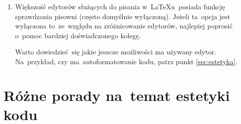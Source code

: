 \documentclass[a4paper,11pt]{article}
\newcommand{\tbs}{\textbackslash}  %
\begin{document}
\begin{enumerate}
  Jakikolwiek byłby dokładny sposób działania \texttt{\tbs
    newcommand}, sprawia~on, że~czasem \LaTeX{} protestuje jeśli
  w~definicji komendy nie umieści~się w~definicji dodatkowej pary
  nawiasów wąsatych wokół argumentów: \texttt{\#numer}. Dlatego
  w~przykładach w~tym tekście zawsze taką parę umieszczamy.
\item Większość edytorów służących do pisania w~\LaTeX u~posiada
  funkcję sprawdzania pisowni (często domyślnie wyłączoną). Jeżeli
  ta~opcja jest wyłączona to~ze~względu na zróżnicowanie edytorów,
  najlepiej poprosić o~pomoc bardziej doświadczonego kolegę.

  Warto dowiedzieć~się jakie jeszcze możliwości ma używany edytor.
  Na~przykład, czy ma~autoformatowanie kodu, patrz punkt
  \eqref{sec:estetyka}.
\end{enumerate}





\section{Różne porady na~temat estetyki kodu}
\label{sec:estetyka}
\end{document}
